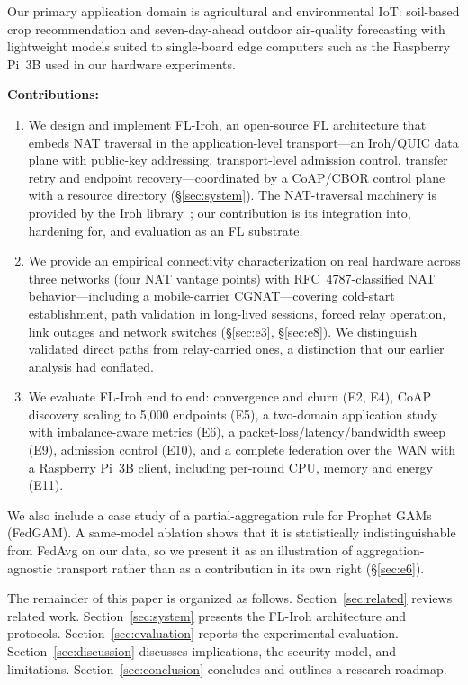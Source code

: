 Our primary application domain is agricultural and environmental IoT: soil-based crop recommendation and seven-day-ahead outdoor air-quality forecasting with lightweight models suited to single-board edge computers such as the Raspberry Pi~3B used in our hardware experiments.

\noindent\textbf{Contributions:}
\begin{enumerate}
    \item We design and implement FL-Iroh, an open-source FL architecture that embeds NAT traversal in the application-level transport---an Iroh\slash QUIC data plane with public-key addressing, transport-level admission control, transfer retry and endpoint recovery---coordinated by a CoAP\slash CBOR control plane with a resource directory (\S\ref{sec:system}). The NAT-traversal machinery is provided by the Iroh library~\cite{iroh2024}; our contribution is its integration into, hardening for, and evaluation as an FL substrate.
    \item We provide an empirical connectivity characterization on real hardware across three networks (four NAT vantage points) with RFC~4787-classified NAT behavior---including a mobile-carrier CGNAT---covering cold-start establishment, path validation in long-lived sessions, forced relay operation, link outages and network switches (\S\ref{sec:e3}, \S\ref{sec:e8}). We distinguish validated direct paths from relay-carried ones, a distinction that our earlier analysis had conflated.
    \item We evaluate FL-Iroh end to end: convergence and churn (E2, E4), CoAP discovery scaling to 5{,}000 endpoints (E5), a two-domain application study with imbalance-aware metrics (E6), a packet-loss/latency/bandwidth sweep (E9), admission control (E10), and a complete federation over the WAN with a Raspberry Pi~3B client, including per-round CPU, memory and energy (E11).
\end{enumerate}

We also include a case study of a partial-aggregation rule for Prophet GAMs (FedGAM). A same-model ablation shows that it is statistically indistinguishable from FedAvg on our data, so we present it as an illustration of aggregation-agnostic transport rather than as a contribution in its own right (\S\ref{sec:e6}).

The remainder of this paper is organized as follows. Section~\ref{sec:related} reviews related work. Section~\ref{sec:system} presents the FL-Iroh architecture and protocols. Section~\ref{sec:evaluation} reports the experimental evaluation. Section~\ref{sec:discussion} discusses implications, the security model, and limitations. Section~\ref{sec:conclusion} concludes and outlines a research roadmap.
